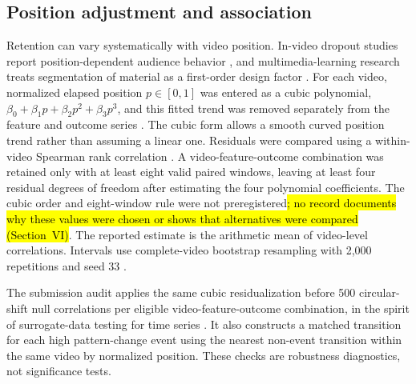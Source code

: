 \documentclass{ieeeaccess}
\newcommand{\rev}[1]{\hl{#1}}
\newcommand{\rev}[1]{#1}
\begin{document}
\subsection{Position adjustment and association}
Retention can vary systematically with video position. In-video dropout studies report position-dependent audience behavior \cite{kim2014dropouts}, and multimedia-learning research treats segmentation of material as a first-order design factor \cite{mayer2009multimedia}. For each video, normalized elapsed position $p\in[0,1]$ was entered as a cubic polynomial, $\beta_0+\beta_1p+\beta_2p^2+\beta_3p^3$, and this fitted trend was removed separately from the feature and outcome series \cite{hastie2009esl}. The cubic form allows a smooth curved position trend rather than assuming a linear one. Residuals were compared using a within-video Spearman rank correlation \cite{spearman1904association}. A video-feature-outcome combination was retained only with at least eight valid paired windows, leaving at least four residual degrees of freedom after estimating the four polynomial coefficients. The cubic order and eight-window rule were not preregistered\rev{; no record documents why these values were chosen or shows that alternatives were compared (Section~VI)}. The reported estimate is the arithmetic mean of video-level correlations. Intervals use complete-video bootstrap resampling with 2,000 repetitions and seed 33 \cite{efron1979bootstrap}.

The submission audit applies the same cubic residualization before 500 circular-shift null correlations per eligible video-feature-outcome combination, in the spirit of surrogate-data testing for time series \cite{theiler1992surrogate}. It also constructs a matched transition for each high pattern-change event using the nearest non-event transition within the same video by normalized position. These checks are robustness diagnostics, not significance tests.
\end{document}
